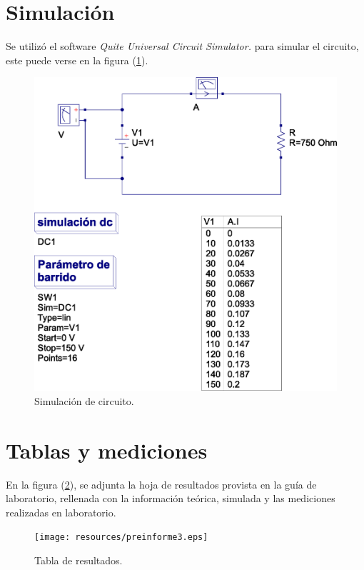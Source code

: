 \documentclass[letter,11pt]{article}
\begin{document}
\section{Simulación}
Se utilizó el software \emph{Quite Universal Circuit Simulator.} para simular
el circuito, este puede verse en la figura (\ref{simulacion}).
\\

\begin{figure}[!h]
\centering
\includegraphics[scale=0.55]{resources/simulacion.eps}
\caption{Simulación de circuito.}
\label{simulacion}
\end{figure}

\newpage

\section{Tablas y mediciones}
En la figura (\ref{tablas}), se adjunta la hoja de resultados provista en la
guía de laboratorio, rellenada con la información teórica, simulada y las
mediciones realizadas en laboratorio.

\begin{figure}[!h]
\centering
\texttt{[image: resources/preinforme3.eps]}
\caption{Tabla de resultados.}
\label{tablas}
\end{figure}
\end{document}
